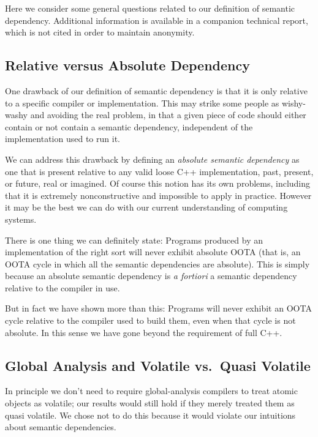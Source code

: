 Here we consider some general questions related to our definition of
semantic dependency.
Additional information is available in a companion technical report,
which is not cited in order to maintain anonymity.

\subsection{Relative versus Absolute Dependency}
\label{sec:Relative versus Absolute Dependency}

One drawback of our definition of semantic dependency is that it is only
relative to a specific compiler or implementation.
This may strike some people as wishy-washy and avoiding the real
problem, in that a given piece of code should either contain or not
contain a semantic dependency, independent of the implementation used to
run it.

We can address this drawback by defining an \emph{absolute semantic
dependency} as one that is present relative to any valid loose C++
implementation, past, present, or future, real or imagined.
Of course this notion has its own problems, including that it is
extremely nonconstructive and impossible to apply in practice.
However it may be the best we can do with our current understanding
of computing systems.

There is one thing we can definitely state:
Programs produced by an implementation of the right sort will never
exhibit absolute OOTA (that is, an OOTA cycle in which all the
semantic dependencies are absolute).
This is simply because an absolute semantic dependency is {\it
a fortiori\/} a semantic dependency relative to the compiler in use.

But in fact we have shown more than this:
Programs will never exhibit an OOTA cycle relative to the compiler
used to build them, even when that cycle is not absolute.
In this sense we have gone beyond the requirement of full C++.

\subsection{Global Analysis and Volatile vs.\ Quasi Volatile}
\label{sec:Global Analysis and Volatile vs. Quasi Volatile}

In principle we don't need to require global-analysis compilers to
treat atomic objects as volatile; our results would still hold if they
merely treated them as quasi volatile.
We chose not to do this because it would violate our intuitions about
semantic dependencies.

